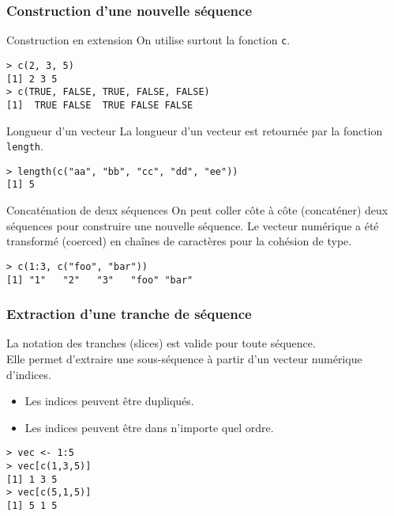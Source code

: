 \documentclass[10pt]{beamer}
\begin{document}
\begin{frame}[fragile]
  \frametitle{Construction d'une nouvelle séquence}
  \begin{alertblock}{Construction en extension}
    On utilise surtout la fonction \alert{\texttt{c}}.
    \begin{lstlisting}
> c(2, 3, 5)
[1] 2 3 5
> c(TRUE, FALSE, TRUE, FALSE, FALSE)
[1]  TRUE FALSE  TRUE FALSE FALSE
\end{lstlisting}
  \end{alertblock}

  \begin{block}{Longueur d'un vecteur}
    La longueur d’un vecteur est retournée par la fonction \texttt{length}.
    \begin{lstlisting}
> length(c("aa", "bb", "cc", "dd", "ee"))
[1] 5      
    \end{lstlisting}
  \end{block}

  \begin{block}{Concaténation de deux séquences}
    On peut coller côte à côte (concaténer) deux séquences pour construire une nouvelle séquence.
    Le vecteur numérique a été transformé (\alert{coerced}) en chaînes de caractères pour la cohésion de type.
    \begin{lstlisting}
> c(1:3, c("foo", "bar"))
[1] "1"   "2"   "3"   "foo" "bar"      
\end{lstlisting}
  \end{block}
\end{frame}
\begin{frame}[fragile]
  \frametitle{Extraction d'une tranche de séquence}
La notation des tranches (\alert{slices}) est valide pour toute séquence. \\
Elle permet d’extraire une sous-séquence à partir d’un \alert{vecteur numérique d’indices}.
\begin{itemize}
\item Les indices peuvent être dupliqués.
\item Les indices peuvent être dans n'importe quel ordre.  
\end{itemize}
\begin{lstlisting}
> vec <- 1:5
> vec[c(1,3,5)]
[1] 1 3 5
> vec[c(5,1,5)]
[1] 5 1 5  
\end{lstlisting}
\end{frame}
\end{document}
